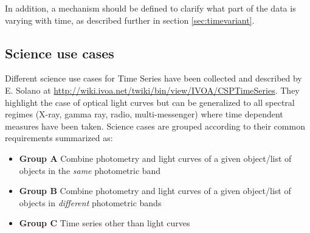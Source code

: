 \documentclass[11pt,a4paper]{ivoa}
\begin{document}
In addition, a mechanism should be defined to clarify what part of the data is varying with time, as described further in section \ref{sec:timevariant}.

\subsection{Science use cases}
\label{sect:usecases}
Different science use cases for Time Series have been collected and described by E. Solano  at \url{http://wiki.ivoa.net/twiki/bin/view/IVOA/CSPTimeSeries}.
They highlight the case of optical light curves but can be generalized to all spectral regimes (X-ray, gamma ray, radio, multi-messenger)  where time dependent measures have been taken.
Science cases are grouped according to their common requirements summarized as:
\begin{itemize}
\item \textbf{Group A} Combine photometry and light curves of a given object/list of objects in the \emph{same} photometric band
\item \textbf{Group B} Combine photometry and light curves of a given object/list of objects in \emph{different} photometric bands
\item \textbf{Group C} Time series other than light curves
\end{itemize}

%
\end{document}
